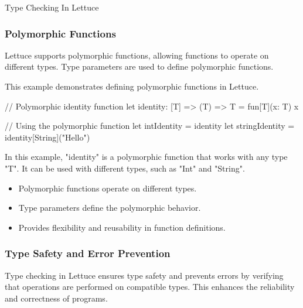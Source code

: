 \begin{notes}{Type Checking In Lettuce}
\begin{highlight}
    \end{highlight}
    
    \subsubsection*{Polymorphic Functions}
    
    Lettuce supports polymorphic functions, allowing functions to operate on different types. Type parameters are used to define polymorphic functions.
    
    \begin{highlight}
    
        This example demonstrates defining polymorphic functions in Lettuce.
    
    \begin{code}[Lettuce]
    // Polymorphic identity function
    let identity: [T] => (T) => T = fun[T](x: T) {
        x
    }
    
    // Using the polymorphic function
    let intIdentity = identity 
    let stringIdentity = identity[String]("Hello")
    \end{code}
    
        In this example, "identity" is a polymorphic function that works with any type "T". It can be used with different types, such as "Int" and "String".
    
        \begin{itemize}
            \item Polymorphic functions operate on different types.
            \item Type parameters define the polymorphic behavior.
            \item Provides flexibility and reusability in function definitions.
        \end{itemize}
    
    \end{highlight}
    
    \subsubsection*{Type Safety and Error Prevention}
    
    Type checking in Lettuce ensures type safety and prevents errors by verifying that operations are performed on compatible types. This enhances the reliability and correctness of programs.
    
    \begin{highlight}
    

\end{highlight}
\end{notes}
